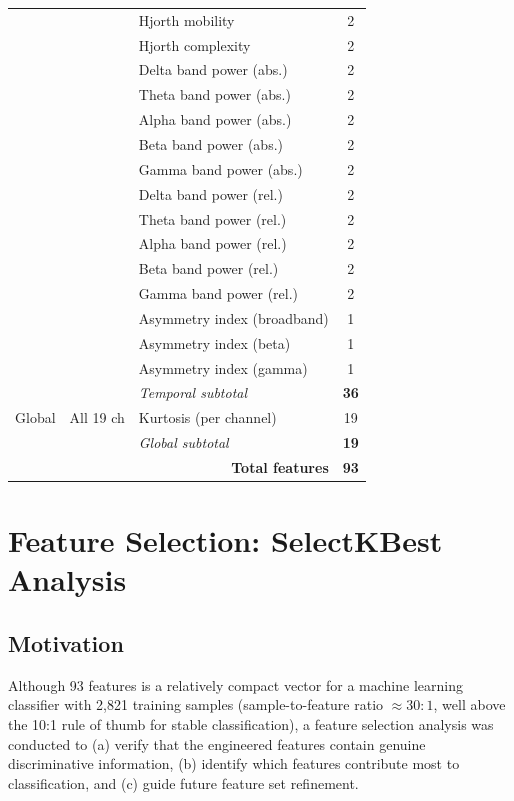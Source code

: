 \begin{table}[htbp]
\begin{tabular}{p{1.5cm} p{2.5cm} p{4.0cm} c}
 & & Hjorth mobility                & 2 \\
 & & Hjorth complexity              & 2 \\
 & & Delta band power (abs.)        & 2 \\
 & & Theta band power (abs.)        & 2 \\
 & & Alpha band power (abs.)        & 2 \\
 & & Beta band power (abs.)         & 2 \\
 & & Gamma band power (abs.)        & 2 \\
 & & Delta band power (rel.)        & 2 \\
 & & Theta band power (rel.)        & 2 \\
 & & Alpha band power (rel.)        & 2 \\
 & & Beta band power (rel.)         & 2 \\
 & & Gamma band power (rel.)        & 2 \\
 & & Asymmetry index (broadband)    & 1 \\
 & & Asymmetry index (beta)         & 1 \\
 & & Asymmetry index (gamma)        & 1 \\
\multirow{1}{*}{}
 & & \textit{Temporal subtotal}     & \textbf{36} \\
\midrule
Global
 & All 19 ch
 & Kurtosis (per channel)          & 19 \\
 & & \textit{Global subtotal}      & \textbf{19} \\
\midrule
\multicolumn{3}{r}{\textbf{Total features}} & \textbf{93} \\
\bottomrule
\end{tabular}
\end{table}

\section{Feature Selection: SelectKBest Analysis}
\label{sec:fe_selection}

\subsection{Motivation}

Although 93 features is a relatively compact vector for a
machine learning classifier with 2{,}821 training samples
(sample-to-feature ratio $\approx 30:1$, well above the
10:1 rule of thumb for stable classification), a feature
selection analysis was conducted to (a) verify that the
engineered features contain genuine discriminative information,
(b) identify which features contribute most to classification,
and (c) guide future feature set refinement.

